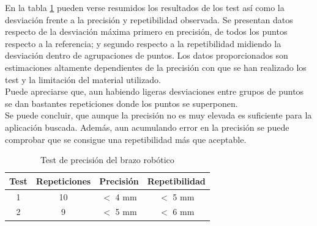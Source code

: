 	En la tabla \ref{tab:resultados_precision} pueden verse resumidos los resultados de los test así como la desviación frente a la precisión y repetibilidad observada. Se presentan datos respecto de la desviación máxima primero en precisión, de todos los puntos respecto a la referencia; y segundo respecto a la repetibilidad midiendo la desviación dentro de agrupaciones de puntos. Los datos proporcionados son estimaciones altamente dependientes de la precisión con que se han realizado los test y la limitación del material utilizado.
	\\
	
	Puede apreciarse que, aun habiendo ligeras desviaciones entre grupos de puntos se dan bastantes repeticiones donde los puntos se superponen. 
	\\
	
	Se puede concluir, que aunque la precisión no es muy elevada es suficiente para la aplicación buscada. Además, aun acumulando error en la precisión se puede comprobar que se consigue una repetibilidad más que aceptable.
	
	\begin{table}[htbp]
		\centering
		\caption{Test de precisión del brazo robótico}
		\label{tab:resultados_precision}
		\begin{center}
			\begin{tabular}{|c|c|c|c|}
				\hline
				\textbf{Test} & \textbf{Repeticiones} & \textbf{Precisión} & \textbf{Repetibilidad} \\
				\hline
				1 & 10 & $<$ 4 mm & $<$ 5 mm \\
				\hline
				2 & 9 & $<$ 5 mm  & $<$ 6 mm \\
				\hline
			\end{tabular}
		\end{center}
	\end{table}